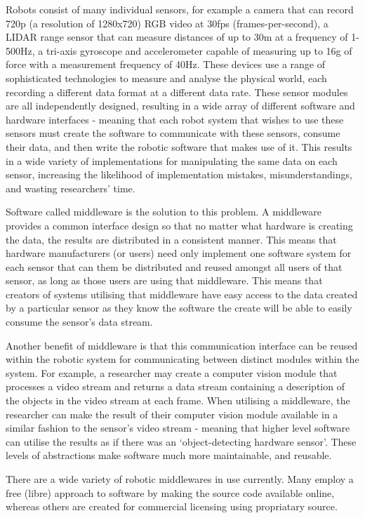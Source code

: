\documentclass[../dissertation.tex]{subfiles}
\begin{document}
Robots consist of many individual sensors, for example a camera that can record 720p (a resolution of 1280x720) RGB video at 30fps (frames-per-second), a LIDAR range sensor that can measure distances of up to 30m at a frequency of 1-500Hz, a tri-axis gyroscope and accelerometer capable of measuring up to 16g of force with a measurement frequency of 40Hz. These devices use a range of sophisticated technologies to measure and analyse the physical world, each recording a different data format at a different data rate. These sensor modules are all independently designed, resulting in a wide array of different software and hardware interfaces - meaning that each robot system that wishes to use these sensors must create the software to communicate with these sensors, consume their data, and then write the robotic software that makes use of it. This results in a wide variety of implementations for manipulating the same data on each sensor, increasing the likelihood of implementation mistakes, misunderstandings, and wasting researchers' time.

Software called middleware is the solution to this problem. A middleware provides a common interface design so that no matter what hardware is creating the data, the results are distributed in a consistent manner. This means that hardware manufacturers (or users) need only implement one software system for each sensor that can them be distributed and reused amongst all users of that sensor, as long as those users are using that middleware. This means that creators of systems utilising that middleware have easy access to the data created by a particular sensor as they know the software the create will be able to easily consume the sensor's data stream.

Another benefit of middleware is that this communication interface can be reused within the robotic system for communicating between distinct modules within the system. For example, a researcher may create a computer vision module that processes a video stream and returns a data stream containing a description of the objects in the video stream at each frame. When utilising a middleware, the researcher can make the result of their computer vision module available in a similar fashion to the sensor's video stream - meaning that higher level software can utilise the results as if there was an `object-detecting hardware sensor'. These levels of abstractions make software much more maintainable, and reusable.

There are a wide variety of robotic middlewares in use currently. Many employ a free (libre) approach to software by making the source code available online, whereas others are created for commercial licensing using propriatary source.
\end{document}

